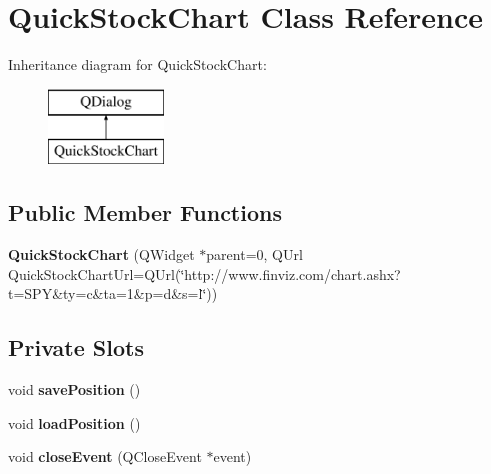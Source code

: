 \hypertarget{class_quick_stock_chart}{\section{Quick\+Stock\+Chart Class Reference}
\label{class_quick_stock_chart}
}
Inheritance diagram for Quick\+Stock\+Chart\+:\begin{figure}[H]
\begin{center}
\leavevmode
\includegraphics[height=2.000000cm]{class_quick_stock_chart}
\end{center}
\end{figure}
\subsection*{Public Member Functions}
\begin{DoxyCompactItemize}
\item 
\hypertarget{class_quick_stock_chart_abbde5e3fbc236b66dad067b652c58837}{{\bfseries Quick\+Stock\+Chart} (Q\+Widget $\ast$parent=0, Q\+Url Quick\+Stock\+Chart\+Url=Q\+Url(\char`\"{}http\+://www.\+finviz.\+com/chart.\+ashx?t=S\+P\+Y\&ty=c\&ta=1\&p=d\&s=l\char`\"{}))}\label{class_quick_stock_chart_abbde5e3fbc236b66dad067b652c58837}

\end{DoxyCompactItemize}
\subsection*{Private Slots}
\begin{DoxyCompactItemize}
\item 
\hypertarget{class_quick_stock_chart_af99b1a624e729e2328350f38968aa1e1}{void {\bfseries save\+Position} ()}\label{class_quick_stock_chart_af99b1a624e729e2328350f38968aa1e1}

\item 
\hypertarget{class_quick_stock_chart_ac9e5329aad2b5bce87fa46d05da331ef}{void {\bfseries load\+Position} ()}\label{class_quick_stock_chart_ac9e5329aad2b5bce87fa46d05da331ef}

\item 
\hypertarget{class_quick_stock_chart_a764cae6c7bcd52ee0d7fe42dd4b33929}{void {\bfseries close\+Event} (Q\+Close\+Event $\ast$event)}\label{class_quick_stock_chart_a764cae6c7bcd52ee0d7fe42dd4b33929}

\end{DoxyCompactItemize}
